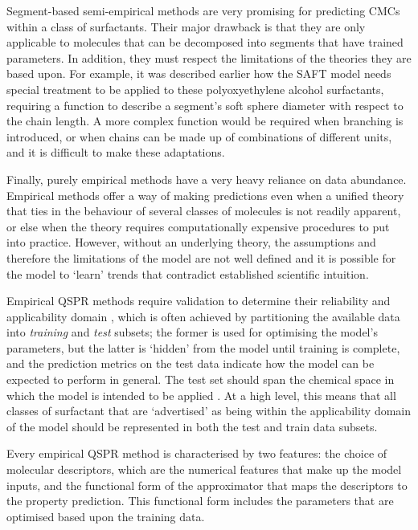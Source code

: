 Segment-based semi-empirical methods are very promising for predicting CMCs
within a class of surfactants. Their major drawback is that they are only
applicable to molecules that can be decomposed into segments that have trained
parameters. In addition, they must respect the limitations of the theories they
are based upon. For example, it was described earlier how the SAFT model needs
special treatment to be applied to these polyoxyethylene alcohol surfactants,
requiring a function to describe a segment's soft sphere diameter with respect
to the chain length. A more complex function would be required when branching is
introduced, or when chains can be made up of combinations of different units,
and it is difficult to make these adaptations.

Finally, purely empirical methods have a very heavy reliance on data abundance.
Empirical methods offer a way of making predictions even when a unified theory
that ties in the behaviour of several classes of molecules is not readily
apparent, or else when the theory requires computationally expensive procedures
to put into practice. However, without an underlying theory, the assumptions and
therefore the limitations of the model are not well defined and it is possible
for the model to `learn' trends that contradict established scientific
intuition.

Empirical QSPR methods require validation to determine their reliability and
applicability domain
\cite{veerasamyValidationQSARModelsstrategies2011,tropshaBestPracticesQSAR2010,leonardSelectionTrainingTest2006},
which is often achieved by partitioning the available data into \emph{training}
and \emph{test} subsets; the former is used for optimising the model's
parameters, but the latter is `hidden' from the model until training is
complete, and the prediction metrics on the test data indicate how the model can
be expected to perform in general. The test set should span the chemical space
in which the model is intended to be applied
\cite{leonardSelectionTrainingTest2006}. At a high level, this means that all
classes of surfactant that are `advertised' as being within the applicability
domain of the model should be represented in both the test and train data
subsets.

Every empirical QSPR method is characterised by two features: the choice of
molecular descriptors, which are the numerical features that make up the model
inputs, and the functional form of the approximator that maps the descriptors to
the property prediction. This functional form includes the parameters that are
optimised based upon the training data.

